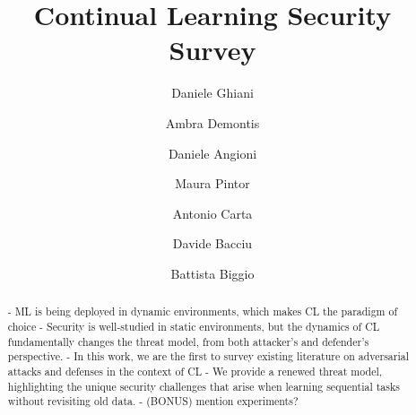 \documentclass[5p,times]{elsarticle}
\begin{document}

\begin{frontmatter}

\title{Continual Learning Security Survey}

\author[unica,uniroma]{Daniele Ghiani}

\author[unica]{Ambra Demontis}

\author[unica]{Daniele Angioni}

\author[unica]{Maura Pintor}

\author[unipi]{Antonio Carta}

\author[unipi]{Davide Bacciu}

\author[unica]{Battista Biggio}


            


\begin{abstract}
- ML is being deployed in dynamic environments, which makes CL the paradigm of choice
- Security is well-studied in static environments, but the dynamics of CL fundamentally changes the threat model, from both attacker's and defender's perspective.
- In this work, we are the first to survey existing literature on adversarial attacks and defenses in the context of CL
- We provide a renewed threat model, highlighting the unique security challenges that arise when learning sequential tasks without revisiting old data.
- (BONUS) mention experiments?
\end{abstract}


\end{frontmatter}
\end{document}
